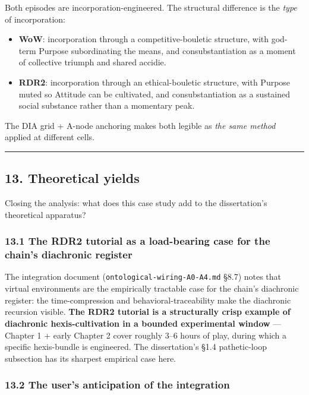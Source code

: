 \documentclass[11pt]{report}
\begin{document}
Both episodes are incorporation-engineered. The structural difference is the \textit{type} of incorporation:


\begin{itemize}
\item \textbf{WoW}: incorporation through a competitive-bouletic structure, with god-term Purpose subordinating the means, and consubstantiation as a moment of collective triumph and shared accidie.
\item \textbf{RDR2}: incorporation through an ethical-bouletic structure, with Purpose muted so Attitude can be cultivated, and consubstantiation as a sustained social substance rather than a momentary peak.
\end{itemize}


The DIA grid + A-node anchoring makes both legible as \textit{the same method} applied at different cells.


\vspace{0.4em}\hrule\vspace{0.8em}


\subsection{13. Theoretical yields}


Closing the analysis: what does this case study add to the dissertation's theoretical apparatus?


\subsubsection{13.1 The RDR2 tutorial as a load-bearing case for the chain's diachronic register}


The integration document (\texttt{ontological-\discretionary{}{}{}wiring-\discretionary{}{}{}A0-\discretionary{}{}{}A4.\discretionary{}{}{}md} §8.7) notes that virtual environments are the empirically tractable case for the chain's diachronic register: the time-compression and behavioral-traceability make the diachronic recursion visible. \textbf{The RDR2 tutorial is a structurally crisp example of diachronic hexis-cultivation in a bounded experimental window} — Chapter 1 + early Chapter 2 cover roughly 3–6 hours of play, during which a specific hexis-bundle is engineered. The dissertation's §1.4 pathetic-loop subsection has its sharpest empirical case here.


\subsubsection{13.2 The user's anticipation of the integration}
\end{document}
